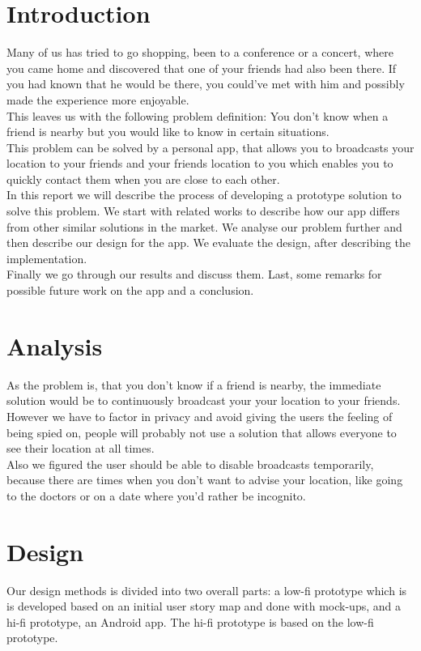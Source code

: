 \documentclass[runningheads,a4paper]{llncs}
\begin{document}
\section{Introduction}
Many of us has tried to go shopping, been to a conference or a concert, where you came home and discovered that one of your friends had also been there. If you had known that he would be there, you could’ve met with him and possibly made the experience more enjoyable.\\

This leaves us with the following problem definition: You don’t know when a friend is nearby but you would like to know in certain situations. \\

This problem can be solved by a personal app, that allows you to  broadcasts your location to your friends and your friends location to you which enables you to quickly contact them when you are close to each other.\\

In this report we will describe the process of developing a prototype solution to solve this problem.
We start with related works to describe how our app differs from other similar solutions in the market. 
We analyse our problem further and then describe our design for the app. We evaluate the design, after describing the implementation. \\
Finally we go through our results and discuss them. Last, some remarks for possible future work on the app and a conclusion. 



\section{Analysis}
As the problem is, that you don’t know if a friend is nearby, the immediate solution would be to continuously broadcast your your location to your friends.
However we have to factor in privacy and avoid giving the users the feeling of being spied on, people will probably not use a solution that allows everyone to see their location at all times.\\
Also we figured the user should be able to disable broadcasts temporarily, because there are times when you don't want to advise your location, like going to the doctors or on a date where you’d rather be incognito. 


\section{Design}
Our design methods is divided into two overall parts: a low-fi prototype which is is developed based on an initial user story map and done with mock-ups, and a hi-fi prototype, an Android app. The hi-fi prototype is based on the low-fi prototype. \\
\end{document}

